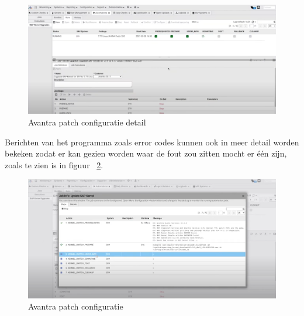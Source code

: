 \begin{figure}[h]
    \centering
    \includegraphics[width=\textwidth]{avantra2.png}
    \caption{Avantra patch configuratie detail}
     \label{fig:avantra2}
\end{figure}
\newpage

Berichten van het programma zoals error codes kunnen ook in meer detail worden bekeken zodat er kan gezien worden waar de fout zou zitten mocht er één zijn, zoals te zien is in figuur ~\ref{fig:avantra3}.

\begin{figure}[h]
    \centering
    \includegraphics[width=\textwidth]{avantra3.png}
    \caption{Avantra patch configuratie}
     \label{fig:avantra3}
\end{figure}
\newpage


